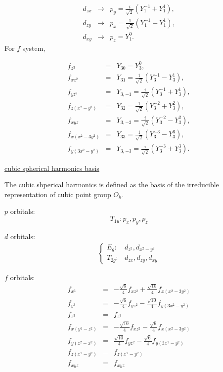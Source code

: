 \begin{eqnarray}
d_{zx} & \rightarrow & p_{y}=\frac{i}{\sqrt{2}}\left(Y_{1}^{-1}+Y_{1}^{1}\right),\nonumber \\
d_{zy} & \rightarrow & p_{x}=\frac{1}{\sqrt{2}}\left(Y_{1}^{-1}-Y_{1}^{1}\right),\\
d_{xy} & \rightarrow & p_{z}=Y_{1}^{0}.\nonumber 
\end{eqnarray}
For $f$ system, 

\begin{eqnarray}
f_{z^{3}} & = & Y_{30}=Y_{3}^{0},\nonumber \\
f_{xz^{2}} & = & Y_{31}=\frac{1}{\sqrt{2}}\left(Y_{3}^{-1}-Y_{3}^{1}\right),\nonumber \\
f_{yz^{2}} & = & Y_{3,-1}=\frac{i}{\sqrt{2}}\left(Y_{3}^{-1}+Y_{3}^{1}\right),\nonumber \\
f_{z(x^{2}-y^{2})} & = & Y_{32}=\frac{1}{\sqrt{2}}\left(Y_{3}^{-2}+Y_{3}^{2}\right),\\
f_{xyz} & = & Y_{3,-2}=\frac{i}{\sqrt{2}}\left(Y_{3}^{-2}-Y_{3}^{2}\right),\nonumber \\
f_{x(x^{2}-3y^{2})} & = & Y_{33}=\frac{1}{\sqrt{2}}\left(Y_{3}^{-3}-Y_{3}^{3}\right),\nonumber \\
f_{y(3x^{2}-y^{2})} & = & Y_{3,-3}=\frac{i}{\sqrt{2}}\left(Y_{3}^{-3}+Y_{3}^{3}\right).\nonumber 
\end{eqnarray}


\underline{cubic spherical harmonics basis}

The cubic shperical harmonics is defined as the basis of the irreducible representation of cubic point group $O_{h}$.

$p$ orbitals:
\begin{equation}
T_{1u}:p_{x},p_{y},p_{z}
\end{equation}


$d$ orbitals:
\begin{gather}
\begin{cases}
E_{g}: & d_{z^{2}},d_{x^{2}-y^{2}}\\
T_{2g}: & d_{zx},d_{zy},d_{xy}
\end{cases}
\end{gather}


$f$ orbitals:
\begin{eqnarray}
f_{x^{3}} & = & -\frac{\sqrt{6}}{4}f_{xz^{2}}+\frac{\sqrt{10}}{4}f_{x(x^{2}-3y^{2})}\nonumber \\
f_{y^{3}} & = & -\frac{\sqrt{6}}{4}f_{yz^{2}}-\frac{\sqrt{10}}{4}f_{y(3x^{2}-y^{2})}\nonumber \\
f_{z^{3}} & = & f_{z^{3}}\nonumber \\
f_{x(y^{2}-z^{2})} & = & -\frac{\sqrt{10}}{4}f_{xz^{2}}-\frac{\sqrt{6}}{4}f_{x(x^{2}-3y^{2})}\\
f_{y(z^{2}-x^{2})} & = & \frac{\sqrt{10}}{4}f_{yz^{2}}-\frac{\sqrt{6}}{4}f_{y(3x^{2}-y^{2})}\nonumber \\
f_{z(x^{2}-y^{2})} & = & f_{z(x^{2}-y^{2})}\nonumber \\
f_{xyz} & = & f_{xyz}\nonumber 
\end{eqnarray}


